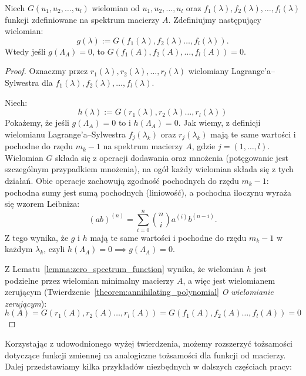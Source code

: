 \begin{theorem}\label{theorem:base_matrix_properties}
Niech $G(u_1, u_2, \ldots, u_l)$ wielomian od $u_1, u_2, \ldots, u_l$ oraz $f_1(\lambda), f_2(\lambda), \ldots, f_l(\lambda)$ funkcji zdefiniowane na spektrum macierzy $A$. Zdefiniujmy następujący wielomian:
$$ g(\lambda) := G(f_1(\lambda), f_2(\lambda) \ldots, f_l(\lambda)).$$
Wtedy jeśli $g(\Lambda_A) = 0$, to $G(f_1(A), f_2(A), \ldots, f_l(A)) = 0$.
\end{theorem}
\begin{proof}
    Oznaczmy przez $r_1(\lambda), r_2(\lambda), \ldots, r_l(\lambda)$ wielomiany Lagrange'a--Sylwestra dla $f_1(\lambda), f_2(\lambda), \ldots, f_l(\lambda)$.

    Niech:
    $$ h(\lambda) := G(r_1(\lambda), r_2(\lambda) \ldots, r_l(\lambda)) $$
    Pokażemy, że jeśli $g(\Lambda_A) = 0$ to i $h(\Lambda_A) = 0$. Jak wiemy, z definicji wielomianu Lagrange'a--Sylwestra $f_j(\lambda_k)$ oraz $r_j(\lambda_k)$ mają te same wartości i pochodne do rzędu $m_k - 1$ na spektrum macierzy $A$, gdzie $j = (1, \ldots, l)$. Wielomian $G$ składa się z operacji dodawania oraz mnożenia (potęgowanie jest szczególnym przypadkiem mnożenia), na ogół każdy wielomian składa się z tych działań. Obie operacje zachowują zgodność pochodnych do rzędu $m_k-1$:
    pochodna sumy jest sumą pochodnych (liniowość), a pochodna iloczynu wyraża się wzorem Leibniza\cite[Rozdział III, \S 4, str. 205]{fichtenholz1999}:
    $$(ab)^{(n)}=\sum_{i=0}^{n}\binom{n}{i}a^{(i)}b^{(n-i)}.$$
    Z tego wynika, że $g$ i $h$ mają te same wartości i pochodne do rzędu $m_k-1$ w każdym $\lambda_k$, czyli $h(\Lambda_A) = 0 \implies g(\Lambda_A) = 0$.
    
    Z Lematu~\ref{lemma:zero_spectrum_function} wynika, że wielomian $h$ jest podzielne przez wielomian minimalny macierzy $A$, a więc jest wielomianem zerującym (Twierdzenie~\ref{theorem:annihilating_polynomial} \textit{O wielomianie zerującym}):
    $$ h(A) = G(r_1(A), r_2(A) \ldots, r_l(A)) = G(f_1(A), f_2(A) \ldots, f_l(A)) = 0$$
\end{proof}

Korzystając z udowodnionego wyżej twierdzenia, możemy rozszerzyć tożsamości dotyczące funkcji zmiennej na analogiczne tożsamości dla funkcji od macierzy. Dalej przedstawiamy kilka przykładów niezbędnych w dalszych częściach pracy:

